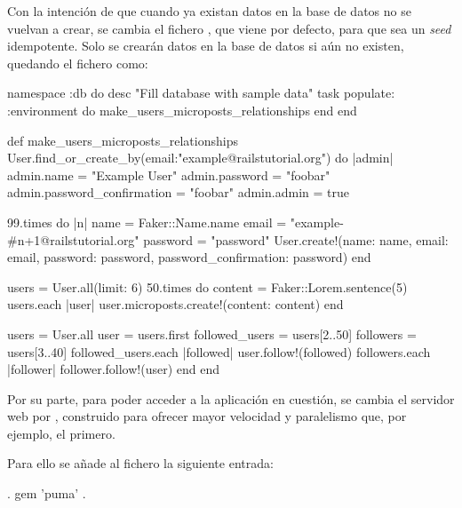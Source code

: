 
Con la intención de que cuando ya existan datos en la base de datos no se vuelvan a crear, se cambia el fichero , que viene por defecto, para que sea un \textit{seed} idempotente. Solo se crearán datos en la base de datos si aún no existen, quedando el fichero como:

\begin{codelisting}
\label{code:idempotentseed}
\begin{code}
namespace :db do
  desc "Fill database with sample data"
  task populate: :environment do
    make_users_microposts_relationships
  end
end

def make_users_microposts_relationships
  User.find_or_create_by(email:"example@railstutorial.org") do |admin| 
  	admin.name = "Example User"
	admin.password = "foobar"
        admin.password_confirmation = "foobar"
        admin.admin = true

	99.times do |n|
	    name  = Faker::Name.name
	    email = "example-#{n+1}@railstutorial.org"
	    password  = "password"
	    User.create!(name:     name,
                 email:    email,
                 password: password,
                 password_confirmation: password)
        end

	users = User.all(limit: 6)
  	50.times do
	    content = Faker::Lorem.sentence(5)
	    users.each { |user| user.microposts.create!(content: content) }
	end  

	users = User.all
	user  = users.first
	followed_users = users[2..50]
	followers      = users[3..40]
	followed_users.each { |followed| user.follow!(followed) }
	followers.each      { |follower| follower.follow!(user) }
  end
end
\end{code}
\end{codelisting}

Por su parte, para poder acceder a la aplicación en cuestión, se cambia el servidor web  por , construido para ofrecer mayor velocidad y paralelismo que, por ejemplo, el primero.

Para ello se añade al fichero  la siguiente entrada:

\begin{codelisting}
\label{code:addpuma}
\begin{code}
.
gem 'puma'
.
\end{code}
\end{codelisting}

